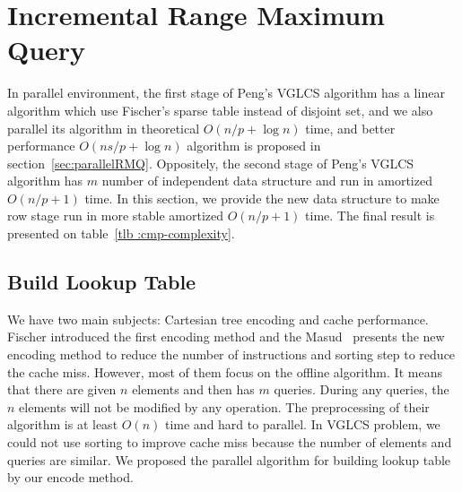 \section{Incremental Range Maximum Query}
\label{sec:parallelIRMQ}

In parallel environment, the first stage of Peng's VGLCS algorithm has a
linear algorithm which use Fischer's sparse table instead of disjoint
set, and we also parallel its algorithm in theoretical $O(n / p + \log
n)$ time, and better performance $O(n s / p + \log n)$ algorithm is
proposed in section~\ref{sec:parallelRMQ}.  Oppositely, the second stage
of Peng's VGLCS algorithm has $m$ number of independent data structure
and run in amortized $O(n / p + 1)$ time.  In this section, we provide
the new data structure to make row stage run in more stable amortized
$O(n / p + 1)$ time.  The final result is presented on table~\ref{tlb
:cmp-complexity}.

\iffalse
VGLCS 問題主要分成縱向和橫向兩階段，縱向處理每一列的區間極值查找，橫向處理每一行的區間極值查找，
兩者合併構成區域極值查找。在縱向方面為數個獨立的數據結構，這部分易於平行；
相反地，在橫向方面，需要共同協作一個數據結構。
綜觀這兩者的差異，縱向需要動態的後綴插入和區間查詢，而橫向可以離線完成區間查找。
在上一節中，我們提出在橫向處理的實作，若限制上述的實作方案在單一處理器上，
時間複雜度的瓶頸在於縱向的動態更新與查找。

在這個章節中，我們提出支持動態插入和區間查找的數據結構，最後的成果如表 \ref{tlb:cmp-complexity}。
\fi




\subsection{Build Lookup Table}

We have two main subjects: Cartesian tree encoding and cache
performance.  Fischer introduced the first encoding method and the
Masud~\cite{Hasan2010CacheOA} presents the new encoding method to reduce
the number of instructions and sorting step to reduce the cache miss.
However, most of them focus on the offline algorithm.  It means that
there are given $n$ elements and then has $m$ queries. During any
queries, the $n$ elements will not be modified by any operation.  The
preprocessing of their algorithm is at least $O(n)$ time and hard to
parallel.  In VGLCS problem, we could not use sorting to improve cache
miss because the number of elements and queries are similar.  We
proposed the parallel algorithm for building lookup table by our encode
method.

